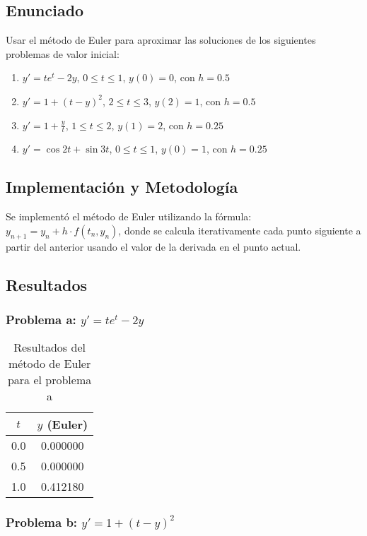 \documentclass[12pt,a4paper]{article}
\begin{document}
\subsection{Enunciado}

Usar el método de Euler para aproximar las soluciones de los siguientes problemas de valor inicial:

\begin{enumerate}
    \item $y' = te^t - 2y$, $0 \leq t \leq 1$, $y(0) = 0$, con $h = 0.5$
    \item $y' = 1 + (t - y)^2$, $2 \leq t \leq 3$, $y(2) = 1$, con $h = 0.5$
    \item $y' = 1 + \frac{y}{t}$, $1 \leq t \leq 2$, $y(1) = 2$, con $h = 0.25$
    \item $y' = \cos 2t + \sin 3t$, $0 \leq t \leq 1$, $y(0) = 1$, con $h = 0.25$
\end{enumerate}

\subsection{Implementación y Metodología}

Se implementó el método de Euler utilizando la fórmula: $y_{n+1} = y_n + h \cdot f(t_n, y_n)$, donde se calcula iterativamente cada punto siguiente a partir del anterior usando el valor de la derivada en el punto actual.

\subsection{Resultados}

\subsubsection{Problema a: $y' = te^t - 2y$}

\begin{table}[H]
\centering
\begin{tabular}{cc}
\toprule
$t$ & $y$ (Euler) \\
\midrule
0.0 & 0.000000 \\
0.5 & 0.000000 \\
1.0 & 0.412180 \\
\bottomrule
\end{tabular}
\caption{Resultados del método de Euler para el problema a}
\end{table}

\subsubsection{Problema b: $y' = 1 + (t - y)^2$}
\end{document}
